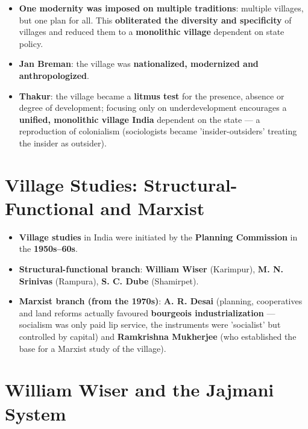 \begin{CriticalPoint}
\begin{itemize}
\item \textbf{One modernity was imposed on multiple traditions}: multiple villages, but one plan for all. This \textbf{obliterated the diversity and specificity} of villages and reduced them to a \textbf{monolithic village} dependent on state policy.
\item \textbf{Jan Breman}: the village was \textbf{nationalized, modernized and anthropologized}.
\item \textbf{Thakur}: the village became a \textbf{litmus test} for the presence, absence or degree of development; focusing only on underdevelopment encourages a \textbf{unified, monolithic village India} dependent on the state --- a reproduction of colonialism (sociologists became 'insider-outsiders' treating the insider as outsider).
\end{itemize}
\end{CriticalPoint}

\section{Village Studies: Structural-Functional and Marxist}

\begin{KeyConcept}
\begin{itemize}
\item \textbf{Village studies} in India were initiated by the \textbf{Planning Commission} in the \textbf{1950s--60s}.
\item \textbf{Structural-functional branch}: \textbf{William Wiser} (Karimpur), \textbf{M. N. Srinivas} (Rampura), \textbf{S. C. Dube} (Shamirpet).
\item \textbf{Marxist branch (from the 1970s)}: \textbf{A. R. Desai} (planning, cooperatives and land reforms actually favoured \textbf{bourgeois industrialization} --- socialism was only paid lip service, the instruments were 'socialist' but controlled by capital) and \textbf{Ramkrishna Mukherjee} (who established the base for a Marxist study of the village).
\end{itemize}
\end{KeyConcept}

\section{William Wiser and the Jajmani System}

